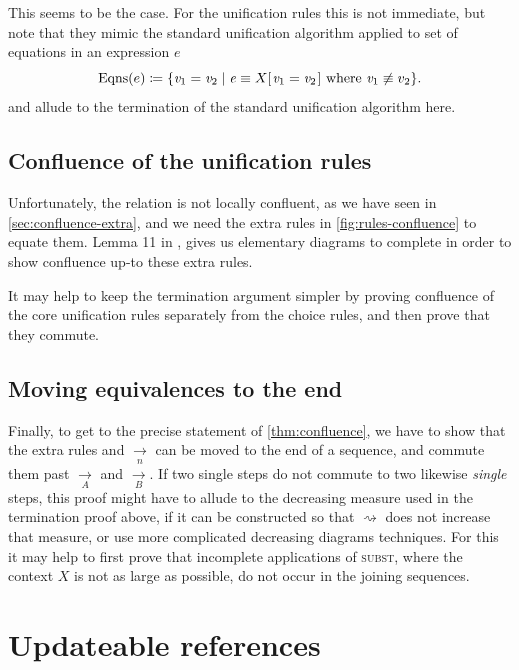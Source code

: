 \documentclass[acmsmall,review,dvipsnames]{acmart}
\newcommand{\Varid}[1]{\mathit{#1}}
\newcommand{\rulename}[1]{\textsc{\small #1}}
\newcommand{\movesto}{\longrightarrow}
\newcommand{\movestoX}{\rightsquigarrow}
\begin{document}
This seems to be the case. For the unification rules this is not immediate, but note that they mimic the standard unification algorithm applied to set of equations in an expression $e$
\[
\operatorname{Eqns}(e) \coloneqq \{\ensuremath{\Varid{v}_{\mathrm{1}}\mathrel{=}\Varid{v}_{\mathrm{2}}} \mid \ensuremath{\Varid{e}\mathrel{\equiv}X [\mskip1.5mu \Varid{v}_{\mathrm{1}}\mathrel{=}\Varid{v}_{\mathrm{2}}\mskip1.5mu]} \text{ where } \ensuremath{\Varid{v}_{\mathrm{1}}} \not\equiv v_2\}.
\]
and allude to the termination of the standard unification algorithm here.

\subsection{Confluence of the unification rules}
\label{sec:conf-proof-u}

Unfortunately, the relation is not locally confluent, as we have seen in \cref{sec:confluence-extra}, and we need the extra rules in \cref{fig:rules-confluence} to equate them. Lemma 11 in , gives us elementary diagrams to complete in order to show confluence up-to these extra rules.

It may help to keep the termination argument simpler by proving confluence of the core unification rules separately from the choice rules, and then prove that they commute.

\subsection{Moving equivalences to the end}
\label{sec:conf-proof-moving}

Finally, to get to the precise statement of \cref{thm:confluence}, we have to show that the extra rules and \ensuremath{\underset{\Varid{n}}\movesto} can be moved to the end of a sequence, and commute them past \ensuremath{\underset{A}\movesto} and \ensuremath{\underset{B}\movesto}. If two single steps do not commute to two likewise \emph{single} steps, this proof might have to allude to the decreasing measure used in the termination proof above, if it can be constructed so that $\movestoX$ does not increase that measure, or use more complicated decreasing diagrams techniques. For this it may help to first prove that incomplete applications of \rulename{subst}, where the context $X$ is not as large as possible, do not occur in the joining sequences.

\fi %

\section{Updateable references} \label{sec:store}
\end{document}
